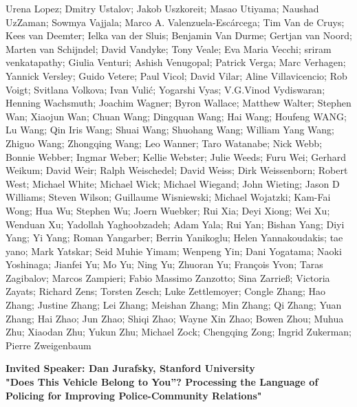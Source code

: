 \documentclass[11pt]{article}
\begin{document}
Urena Lopez; Dmitry Ustalov; Jakob Uszkoreit; Masao Utiyama; Naushad UzZaman; Sowmya Vajjala; Marco A. Valenzuela-Escárcega; Tim Van de Cruys; Kees van Deemter; Ielka van der Sluis; Benjamin Van Durme; Gertjan van Noord; Marten van Schijndel; David Vandyke; Tony Veale; Eva Maria Vecchi; sriram venkatapathy; Giulia Venturi; Ashish Venugopal; Patrick Verga; Marc Verhagen; Yannick Versley; Guido Vetere; Paul Vicol; David Vilar; Aline Villavicencio; Rob Voigt; Svitlana Volkova; Ivan Vulić; Yogarshi Vyas; V.G.Vinod Vydiswaran; Henning Wachsmuth; Joachim Wagner; Byron Wallace; Matthew Walter; Stephen Wan; Xiaojun Wan; Chuan Wang; Dingquan Wang; Hai Wang; Houfeng WANG; Lu Wang; Qin Iris Wang; Shuai Wang; Shuohang Wang; William Yang Wang; Zhiguo Wang; Zhongqing Wang; Leo Wanner; Taro Watanabe; Nick Webb; Bonnie Webber; Ingmar Weber; Kellie Webster; Julie Weeds; Furu Wei; Gerhard Weikum; David Weir; Ralph Weischedel; David Weiss; Dirk Weissenborn; Robert West; Michael White; Michael Wick; Michael Wiegand; John Wieting; Jason D Williams; Steven Wilson; Guillaume Wisniewski; Michael Wojatzki; Kam-Fai Wong; Hua Wu; Stephen Wu; Joern Wuebker; Rui Xia; Deyi Xiong; Wei Xu; Wenduan Xu; Yadollah Yaghoobzadeh; Adam Yala; Rui Yan; Bishan Yang; Diyi Yang; Yi Yang; Roman Yangarber; Berrin Yanikoglu; Helen Yannakoudakis; tae yano; Mark Yatskar; Seid Muhie Yimam; Wenpeng Yin; Dani Yogatama; Naoki Yoshinaga; Jianfei Yu; Mo Yu; Ning Yu; Zhuoran Yu; François Yvon; Taras Zagibalov; Marcos Zampieri; Fabio Massimo Zanzotto; Sina Zarrieß; Victoria Zayats; Richard Zens; Torsten Zesch; Luke Zettlemoyer; Congle Zhang; Hao Zhang; Justine Zhang; Lei Zhang; Meishan Zhang; Min Zhang; Qi Zhang; Yuan Zhang; Hai Zhao; Jun Zhao; Shiqi Zhao; Wayne Xin Zhao; Bowen Zhou; Muhua Zhu; Xiaodan Zhu; Yukun Zhu; Michael Zock; Chengqing Zong; Ingrid Zukerman; Pierre Zweigenbaum

\pagebreak



\begin{center}
{\LARGE \bf Invited Speaker: Dan Jurafsky, Stanford University}\\
{\Large \bf "Does This Vehicle Belong to You”? 
 Processing the Language of Policing for Improving Police-Community Relations"}
\end{center}

\end{document}
